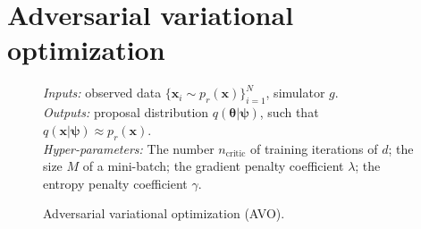 \documentclass[twocolumn,superscriptaddress,aps]{revtex4-1}
\newcommand{\qxpsi}{q(\mathbf{x}|\bfpsi)}
\newcommand{\bftheta}{{\bm \theta}}
\newcommand{\bfpsi}{{\bm \psi}}
\theoremstyle{plain}
\begin{document}

\section{Adversarial variational optimization}

\begin{figure}
    \begin{minipage}{\linewidth}
    \begin{algorithm}[H]
    \caption{Adversarial variational optimization (AVO).}

    \begin{flushleft}
        {\it Inputs:} observed data $\{ \mathbf{x}_i \sim p_r(\mathbf{x}) \}_{i=1}^N$, simulator $g$.\\
        {\it Outputs:} proposal distribution $q(\bftheta|\bfpsi)$, such that $\qxpsi \approx p_r(\mathbf{x})$.\\
        {\it Hyper-parameters:} The number $n_{\text{critic}}$ of training iterations of $d$; the size $M$ of a mini-batch; the gradient penalty coefficient $\lambda$; the entropy penalty coefficient $\gamma$.
    \end{flushleft}


\end{algorithm}
\end{minipage}
\end{figure}
\end{document}
